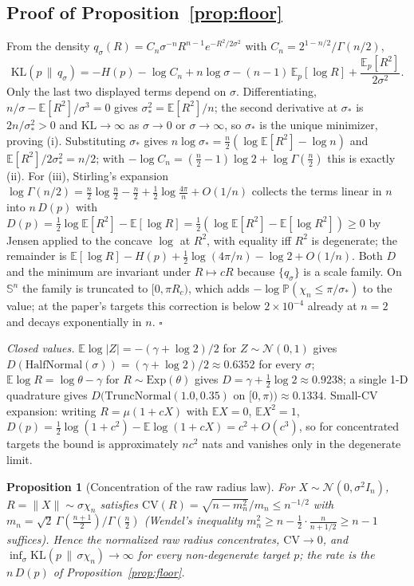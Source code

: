 \documentclass{article}
\newcommand{\E}{\mathbb{E}}
\newcommand{\KL}{\mathrm{KL}}
\newtheorem{proposition}{Proposition}
\theoremstyle{definition}
\theoremstyle{remark}
\newcommand{\SSS}{\mathbb{S}}
\begin{document}
\subsection{Proof of Proposition~\ref{prop:floor}}
From the density $q_\sigma(R)=C_n\sigma^{-n}R^{n-1}e^{-R^2/2\sigma^2}$ with $C_n=2^{1-n/2}/\Gamma(n/2)$,
\[
\KL(p\,\|\,q_\sigma)=-H(p)-\log C_n+n\log\sigma-(n-1)\,\E_p[\log R]+\frac{\E_p[R^2]}{2\sigma^2}.
\]
Only the last two displayed terms depend on $\sigma$. Differentiating, $n/\sigma-\E[R^2]/\sigma^3=0$ gives $\sigma_*^2=\E[R^2]/n$; the second derivative at $\sigma_*$ is $2n/\sigma_*^2>0$ and $\KL\to\infty$ as $\sigma\to0$ or $\sigma\to\infty$, so $\sigma_*$ is the unique minimizer, proving (i). Substituting $\sigma_*$ gives $n\log\sigma_*=\tfrac n2(\log\E[R^2]-\log n)$ and $\E[R^2]/2\sigma_*^2=n/2$; with $-\log C_n=(\tfrac n2-1)\log2+\log\Gamma(\tfrac n2)$ this is exactly (ii). For (iii), Stirling's expansion $\log\Gamma(n/2)=\tfrac n2\log\tfrac n2-\tfrac n2+\tfrac12\log\tfrac{4\pi}{n}+O(1/n)$ collects the terms linear in $n$ into $n\,D(p)$ with $D(p)=\tfrac12\log\E[R^2]-\E[\log R]=\tfrac12(\log\E[R^2]-\E[\log R^2])\ge0$ by Jensen applied to the concave $\log$ at $R^2$, with equality iff $R^2$ is degenerate; the remainder is $\E[\log R]-H(p)+\tfrac12\log(4\pi/n)-\log2+O(1/n)$. Both $D$ and the minimum are invariant under $R\mapsto cR$ because $\{q_\sigma\}$ is a scale family. On $\SSS^n$ the family is truncated to $[0,\pi R_c)$, which adds $-\log\mathbb{P}(\chi_n\le\pi/\sigma_*)$ to the value; at the paper's targets this correction is below $2\times10^{-4}$ already at $n=2$ and decays exponentially in $n$. \hfill$\square$

\emph{Closed values.} $\E\log|Z|=-(\gamma+\log2)/2$ for $Z\sim\mathcal N(0,1)$ gives $D(\mathrm{HalfNormal}(\sigma))=(\gamma+\log2)/2\approx0.6352$ for every $\sigma$; $\E\log R=\log\theta-\gamma$ for $R\sim\mathrm{Exp}(\theta)$ gives $D=\gamma+\tfrac12\log2\approx0.9238$; a single 1-D quadrature gives $D\bigl(\mathrm{TruncNormal}(1.0,0.35)\text{ on }[0,\pi)\bigr)\approx0.1334$. Small-CV expansion: writing $R=\mu(1+cX)$ with $\E X=0$, $\E X^2=1$, $D(p)=\tfrac12\log(1+c^2)-\E\log(1+cX)=c^2+O(c^3)$, so for concentrated targets the bound is approximately $n c^2$ nats and vanishes only in the degenerate limit.

\begin{proposition}[Concentration of the raw radius law]
\label{prop:concentration}
For $X\sim\mathcal N(0,\sigma^2 I_n)$, $R=\|X\|\sim\sigma\chi_n$ satisfies $\mathrm{CV}(R)=\sqrt{n-m_n^2}/m_n\le n^{-1/2}$ with $m_n=\sqrt2\,\Gamma(\tfrac{n+1}2)/\Gamma(\tfrac n2)$ (Wendel's inequality $m_n^2\ge n-\tfrac12\cdot\tfrac{n}{n+ 1/2}\ge n-1$ suffices). Hence the normalized raw radius concentrates, $\mathrm{CV}\to0$, and $\inf_\sigma\KL(p\,\|\,\sigma\chi_n)\to\infty$ for every non-degenerate target $p$; the rate is the $n\,D(p)$ of Proposition~\ref{prop:floor}.
\end{proposition}
\end{document}

